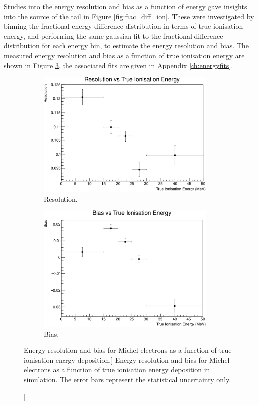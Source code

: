 Studies into the energy resolution and bias as a function of energy gave
insights into the source of the tail in Figure \ref{fig:frac_diff_ion}. These
were investigated by binning the fractional energy difference distribution in
terms of true ionisation energy, and performing the same gaussian fit to the
fractional difference distribution for each energy bin, to estimate the energy
resolution and bias. The measured energy resolution and bias as a function of 
true ionisation energy are shown in Figure \ref{fig:res_and_bias_ion}, the 
associated fits are given in Appendix \ref{ch:energyfits}.
\begin{figure}
	\centering
	\begin{subfigure}[b]{\textwidth}
		\centering
		\includegraphics[width=0.95\textwidth]{figures/res_v_energy_ion.pdf}
		\caption {Resolution.}
		\label{fig:res_ion}
	\end{subfigure}
	\begin{subfigure}[b]{\textwidth}
		\centering
		\vspace{5mm}
		\includegraphics[width=0.95\textwidth]{figures/bias_v_energy_ion.pdf}
		\caption {Bias.}
		\label{fig:bias_ion}
	\end{subfigure}
	\caption
	[Energy resolution and bias for Michel electrons as a function of true 
	ionisation energy deposition.]
	{Energy resolution and bias for Michel electrons as a function of true 
	ionisation energy deposition in \protodune{} simulation. The error bars
	represent the statistical uncertainty only.}
	\label{fig:res_and_bias_ion}
\end{figure}

